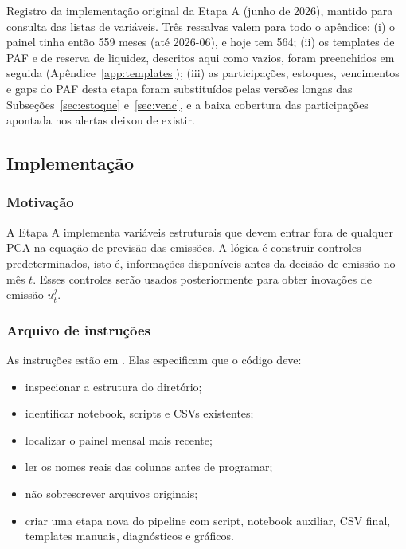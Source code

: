 \documentclass[12pt,a4paper]{article}
\begin{document}
Registro da implementação original da Etapa A (junho de 2026), mantido para
consulta das listas de variáveis. Três ressalvas valem para todo o apêndice: (i) o
painel tinha então 559 meses (até 2026-06), e hoje tem 564; (ii) os templates de
PAF e de reserva de liquidez, descritos aqui como vazios, foram preenchidos em
seguida (Apêndice~\ref{app:templates}); (iii) as participações, estoques,
vencimentos e gaps do PAF desta etapa foram substituídos pelas versões longas das
Subseções~\ref{sec:estoque} e~\ref{sec:venc}, e a baixa cobertura das
participações apontada nos alertas deixou de existir.

\subsection{Implementação}

\subsubsection{Motivação}

A Etapa A implementa variáveis estruturais que devem entrar fora de qualquer PCA na
equação de previsão das emissões. A lógica é construir controles predeterminados,
isto é, informações disponíveis antes da decisão de emissão no mês \(t\). Esses
controles serão usados posteriormente para obter inovações de emissão \(u_t^j\).

\subsubsection{Arquivo de instruções}

As instruções estão em . Elas especificam que o código deve:

\begin{itemize}[leftmargin=1.2cm]
    \item inspecionar a estrutura do diretório;
    \item identificar notebook, scripts e CSVs existentes;
    \item localizar o painel mensal mais recente;
    \item ler os nomes reais das colunas antes de programar;
    \item não sobrescrever arquivos originais;
    \item criar uma etapa nova do pipeline com script, notebook auxiliar, CSV final,
    templates manuais, diagnósticos e gráficos.
\end{itemize}
\end{document}
